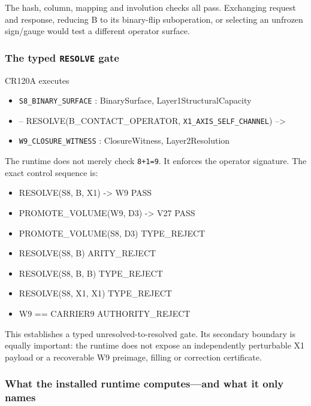 The hash, column, mapping and involution checks all pass. Exchanging
request and response, reducing B to its binary-flip suboperation, or
selecting an unfrozen sign/gauge would test a different operator
surface.

\subsubsection{\texorpdfstring{The typed \texttt{RESOLVE}
gate}{The typed RESOLVE gate}}\label{viii-ch05-the-typed-resolve-gate}

CR120A executes

\begin{itemize}
\tightlist
\item
  \nolinkurl{S8_BINARY_SURFACE} : BinarySurface, Layer1StructuralCapacity
\item
  -- RESOLVE(B\_CONTACT\_OPERATOR, \nolinkurl{X1_AXIS_SELF_CHANNEL})
  --\textgreater{}
\item
  \nolinkurl{W9_CLOSURE_WITNESS} : ClosureWitness, Layer2Resolution
\end{itemize}

The runtime does not merely check \texttt{8+1=9}. It enforces the
operator signature. The exact control sequence is:

\begin{itemize}
\tightlist
\item
  RESOLVE(S8, B, X1) -\textgreater{} W9 PASS
\item
  PROMOTE\_VOLUME(W9, D3) -\textgreater{} V27 PASS
\item
  PROMOTE\_VOLUME(S8, D3) TYPE\_REJECT
\item
  RESOLVE(S8, B) ARITY\_REJECT
\item
  RESOLVE(S8, B, B) TYPE\_REJECT
\item
  RESOLVE(S8, X1, X1) TYPE\_REJECT
\item
  W9 == CARRIER9 AUTHORITY\_REJECT
\end{itemize}

This establishes a typed unresolved-to-resolved gate. Its secondary
boundary is equally important: the runtime does not expose an
independently perturbable X1 payload or a recoverable W9 preimage,
filling or correction certificate.

\subsubsection{What the installed runtime computes---and what it only
names}\label{viii-ch05-what-the-installed-runtime-computesand-what-it-only-names}

